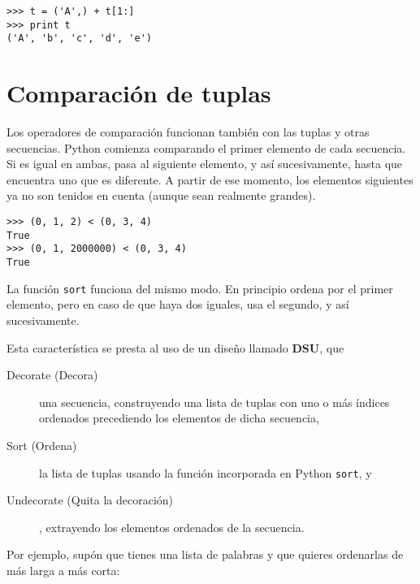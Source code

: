 \beforeverb
\begin{verbatim}
>>> t = ('A',) + t[1:]
>>> print t
('A', 'b', 'c', 'd', 'e')
\end{verbatim}
\afterverb
%

\section{Comparación de tuplas}


Los operadores de comparación funcionan también con las tuplas y otras secuencias.
Python comienza comparando el primer elemento de cada
secuencia. Si es igual en ambas, pasa al siguiente elemento,
y así sucesivamente, hasta que encuentra uno que es diferente. A partir de ese momento,
los elementos siguientes ya no son tenidos en cuenta (aunque sean realmente grandes).


\beforeverb
\begin{verbatim}
>>> (0, 1, 2) < (0, 3, 4)
True
>>> (0, 1, 2000000) < (0, 3, 4)
True
\end{verbatim}
\afterverb
%
La función {\tt sort} funciona del mismo modo. En principio
ordena por el primer elemento, pero en caso de que haya dos iguales,
usa el segundo, y así sucesivamente. 

Esta característica se presta al uso de un diseño llamado {\bf DSU}, que

\begin{description}

\item[Decorate (Decora)] una secuencia, construyendo una lista de tuplas
con uno o más índices ordenados precediendo los elementos de dicha secuencia,

\item[Sort (Ordena)] la lista de tuplas usando la función incorporada en Python {\tt sort}, y

\item[Undecorate (Quita la decoración)], extrayendo los elementos ordenados de la secuencia.

\end{description}

\label{DSU}

Por ejemplo, supón que tienes una lista de palabras y que quieres
ordenarlas de más larga a más corta:

